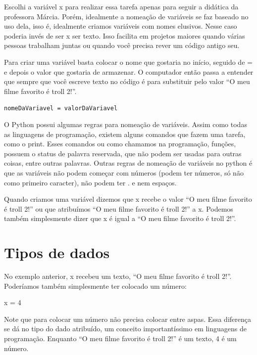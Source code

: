 \documentclass[
  letterpaper,
  DIV=11,
  numbers=noendperiod]{scrreprt}
\newenvironment{Shaded}{\begin{snugshade}}{\end{snugshade}}
\newcommand{\DecValTok}[1]{\textcolor[rgb]{0.68,0.00,0.00}{#1}}
\newcommand{\NormalTok}[1]{\textcolor[rgb]{0.00,0.23,0.31}{#1}}
\newcommand{\OperatorTok}[1]{\textcolor[rgb]{0.37,0.37,0.37}{#1}}
\begin{document}
Escolhi a variável x para realizar essa tarefa apenas para seguir a
didática da professora Márcia. Porém, idealmente a nomeação de variáveis
se faz baseado no uso dela, isso é, idealmente criamos variáveis com
nomes elusivos. Nesse caso poderia invés de ser x ser texto. Isso
facilita em projetos maiores quando várias pessoas trabalham juntas ou
quando você precisa rever um código antigo seu.

Para criar uma variável basta colocar o nome que gostaria no início,
seguido de = e depois o valor que gostaria de armazenar. O computador
então passa a entender que sempre que você escreve texto no código é
para substituir pelo valor ``O meu filme favorito é troll 2!''.

\texttt{nomeDaVariavel\ =\ valorDaVariavel}

O Python possui algumas regras para nomeação de variáveis. Assim como
todas as linguagens de programação, existem alguns comandos que fazem
uma tarefa, como o print. Esses comandos ou como chamamos na
programação, funções, possuem o status de palavra reservada, que não
podem ser usadas para outras coisas, entre outras palavras. Outras
regras de nomeação de variáveis no python é que as variáveis não podem
começar com números (podem ter números, só não como primeiro caracter),
não podem ter . e nem espaços.

Quando criamos uma variável dizemos que x recebe o valor ``O meu filme
favorito é troll 2!'' ou que atribuímos ``O meu filme favorito é troll
2!'' a x. Podemos também simplesmente dizer que x é igual a ``O meu
filme favorito é troll 2!''.


\hypertarget{tipos-de-dados}{%
\chapter{Tipos de dados}\label{tipos-de-dados}}

No exemplo anterior, x recebeu um texto, ``O meu filme favorito é troll
2!''. Poderíamos também simplesmente ter colocado um número:

\begin{Shaded}
\begin{Highlighting}[]
\NormalTok{x }\OperatorTok{=} \DecValTok{4}
\end{Highlighting}
\end{Shaded}

Note que para colocar um número não precisa colocar entre aspas. Essa
diferença se dá no tipo do dado atribuído, um conceito importantíssimo
em linguagens de programação. Enquanto ``O meu filme favorito é troll
2!'' é um texto, 4 é um número.
\end{document}
